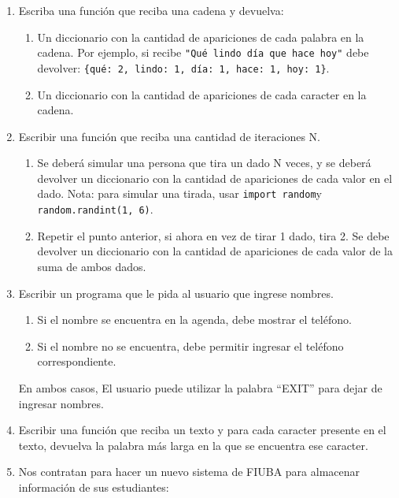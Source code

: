 \documentclass[
  letterpaper,
  DIV=11,
  numbers=noendperiod]{scrreprt}
\providecommand{\tightlist}{%
  \setlength{\itemsep}{0pt}\setlength{\parskip}{0pt}}\usepackage{longtable,booktabs,array}
\begin{document}
\begin{enumerate}
\def\labelenumi{\arabic{enumi}.}
\setcounter{enumi}{1}
\item
  Escriba una función que reciba una cadena y devuelva:

  \begin{enumerate}
  \def\labelenumii{\alph{enumii}.}
  \tightlist
  \item
    Un diccionario con la cantidad de apariciones de cada palabra en la
    cadena. Por ejemplo, si recibe
    \texttt{"Qué\ lindo\ día\ que\ hace\ hoy"} debe devolver:
    \texttt{\{\textquotesingle{}qué\textquotesingle{}:\ 2,\ \textquotesingle{}lindo\textquotesingle{}:\ 1,\ \textquotesingle{}día\textquotesingle{}:\ 1,\ \textquotesingle{}hace\textquotesingle{}:\ 1,\ \textquotesingle{}hoy\textquotesingle{}:\ 1\}}.
  \item
    Un diccionario con la cantidad de apariciones de cada caracter en la
    cadena.
  \end{enumerate}
\item
  Escribir una función que reciba una cantidad de iteraciones N.

  \begin{enumerate}
  \def\labelenumii{\alph{enumii}.}
  \item
    Se deberá simular una persona que tira un dado N veces, y se deberá
    devolver un diccionario con la cantidad de apariciones de cada valor
    en el dado. Nota: para simular una tirada, usar
    \texttt{import\ random}y \texttt{random.randint(1,\ 6)}.
  \item
    Repetir el punto anterior, si ahora en vez de tirar 1 dado, tira 2.
    Se debe devolver un diccionario con la cantidad de apariciones de
    cada valor de la suma de ambos dados.
  \end{enumerate}
\item
  Escribir un programa que le pida al usuario que ingrese nombres.

  \begin{enumerate}
  \def\labelenumii{\alph{enumii}.}
  \tightlist
  \item
    Si el nombre se encuentra en la agenda, debe mostrar el teléfono.
  \item
    Si el nombre no se encuentra, debe permitir ingresar el teléfono
    correspondiente.
  \end{enumerate}

  En ambos casos, El usuario puede utilizar la palabra ``EXIT'' para
  dejar de ingresar nombres.
\item
  Escribir una función que reciba un texto y para cada caracter presente
  en el texto, devuelva la palabra más larga en la que se encuentra ese
  caracter.
\item
  Nos contratan para hacer un nuevo sistema de FIUBA para almacenar
  información de sus estudiantes:


\end{enumerate}
\end{document}
